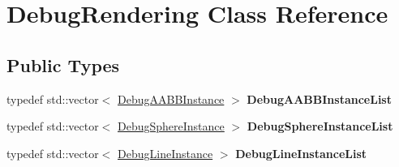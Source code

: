 \hypertarget{classDebugRendering}{}\section{Debug\+Rendering Class Reference}
\label{classDebugRendering}
\subsection*{Public Types}
\begin{DoxyCompactItemize}
\item 
\mbox{\label{classDebugRendering_ae09e1ad33f1ba1575544cf3c70769ecc}} 
typedef std\+::vector$<$ \hyperlink{structDebugAABBInstance}{Debug\+A\+A\+B\+B\+Instance} $>$ {\bfseries Debug\+A\+A\+B\+B\+Instance\+List}
\item 
\mbox{\label{classDebugRendering_a0dabb4da850186ab6f981b00723834e7}} 
typedef std\+::vector$<$ \hyperlink{structDebugSphereInstance}{Debug\+Sphere\+Instance} $>$ {\bfseries Debug\+Sphere\+Instance\+List}
\item 
\mbox{\label{classDebugRendering_a45d525d5ab2cde6b7bceaf070dd6326a}} 
typedef std\+::vector$<$ \hyperlink{structDebugLineInstance}{Debug\+Line\+Instance} $>$ {\bfseries Debug\+Line\+Instance\+List}
\end{DoxyCompactItemize}
